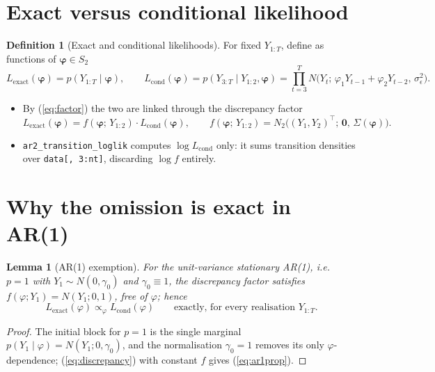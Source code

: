 \documentclass[11pt]{article}
\newcommand{\bZero}{\boldsymbol{0}}
\newcommand{\eref}[1]{(\ref{#1})}
\newcommand{\Lexact}{L_{\mathrm{exact}}}
\newcommand{\Lcond}{L_{\mathrm{cond}}}
\newcommand{\bphi}{\boldsymbol{\varphi}}
\theoremstyle{plain}
\newtheorem{lemma}[proposition]{Lemma}
\theoremstyle{definition}
\newtheorem{definition}[proposition]{Definition}
\theoremstyle{remark}
\begin{document}
\section{Exact versus conditional likelihood}\label{sec:defs}

\begin{definition}[Exact and conditional likelihoods]\label{def:lik}
For fixed $Y_{1:T}$, define as functions of $\bphi \in S_2$
\begin{equation}\label{eq:defs}
  \Lexact(\bphi) = p(Y_{1:T} \mid \bphi),
  \qquad
  \Lcond(\bphi) = p(Y_{3:T} \mid Y_{1:2}, \bphi)
  = \prod_{t=3}^{T}
    N\!\bigl( Y_t ;\, \varphi_1 Y_{t-1} + \varphi_2 Y_{t-2},\,
              \sigma_\epsilon^2 \bigr).
\end{equation}
\end{definition}

\begin{itemize}
  \item By \eref{eq:factor} the two are linked through the discrepancy factor
        \begin{equation}\label{eq:discrepancy}
          \Lexact(\bphi) = f(\bphi;\, Y_{1:2}) \cdot \Lcond(\bphi),
          \qquad
          f(\bphi;\, Y_{1:2})
          = N_2\!\bigl( (Y_1, Y_2)^\top ;\, \bZero,\, \Sigma(\bphi) \bigr).
        \end{equation}
  \item \texttt{ar2\_transition\_loglik} computes $\log \Lcond$ only: it sums
        transition densities over \texttt{data[, 3:nt]}, discarding
        $\log f$ entirely.
\end{itemize}

\section{Why the omission is exact in AR(1)}\label{sec:ar1}

\begin{lemma}[AR(1) exemption]\label{lem:ar1}
For the unit-variance stationary AR(1), i.e.\ $p = 1$ with
$Y_1 \sim N(0, \gamma_0)$ and $\gamma_0 \equiv 1$, the discrepancy factor
satisfies $f(\varphi; Y_1) = N(Y_1; 0, 1)$, free of $\varphi$; hence
\begin{equation}\label{eq:ar1prop}
  \Lexact(\varphi) \propto_{\varphi} \Lcond(\varphi)
  \qquad \text{exactly, for every realisation } Y_{1:T}.
\end{equation}
\end{lemma}

\begin{proof}
The initial block for $p = 1$ is the single marginal
$p(Y_1 \mid \varphi) = N(Y_1; 0, \gamma_0)$, and the normalisation
$\gamma_0 = 1$ removes its only $\varphi$-dependence; \eref{eq:discrepancy}
with constant $f$ gives \eref{eq:ar1prop}.
\end{proof}
\end{document}
